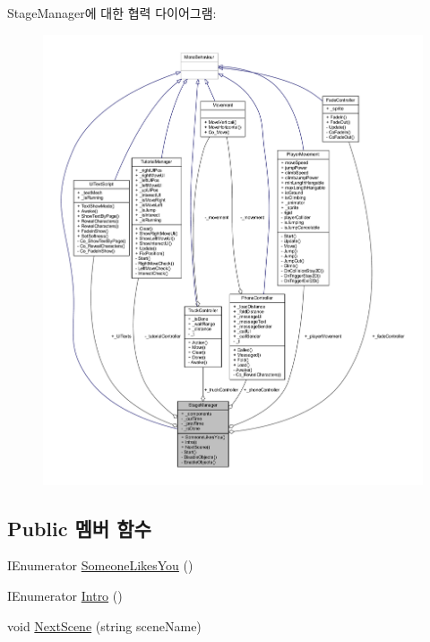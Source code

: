 Stage\+Manager에 대한 협력 다이어그램\+:\nopagebreak
\begin{figure}[H]
\begin{center}
\leavevmode
\includegraphics[width=350pt]{d3/dcb/class_stage_manager__coll__graph}
\end{center}
\end{figure}
\subsection*{Public 멤버 함수}
\begin{DoxyCompactItemize}
\item 
I\+Enumerator \mbox{\hyperlink{class_stage_manager_affba879c5906e1bbb53a18263449108c}{Someone\+Likes\+You}} ()
\item 
I\+Enumerator \mbox{\hyperlink{class_stage_manager_ae8747a960980738fdf6cbb6f542e69b3}{Intro}} ()
\item 
void \mbox{\hyperlink{class_stage_manager_a10d59cedf36dae5138eb9622088fa3dc}{Next\+Scene}} (string scene\+Name)
\end{DoxyCompactItemize}

